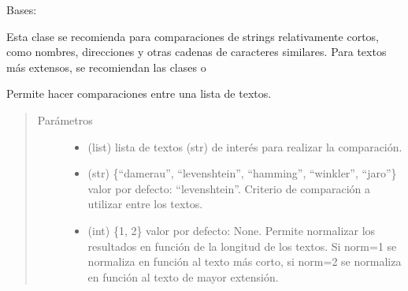 \documentclass[letterpaper,10pt,openany,spanish]{sphinxmanual}
\begin{document}
\begin{fulllineitems}
\label{\detokenize{funciones/comparacion:comparacion.DiferenciaStrings}}
Bases: 

Esta clase se recomienda para comparaciones de strings 
relativamente cortos, como nombres, direcciones y otras cadenas 
de caracteres similares. Para textos más extensos, se recomiendan las 
clases {\hyperref[\detokenize{funciones/comparacion:comparacion.Similitud}]{}} o 
{\hyperref[\detokenize{funciones/comparacion:comparacion.Distancia}]{}}

\begin{fulllineitems}
\label{\detokenize{funciones/comparacion:comparacion.DiferenciaStrings.comparacion_lista}}
Permite hacer comparaciones entre una lista de textos.
\begin{quote}\begin{description}
\item[{Parámetros}] \leavevmode\begin{itemize}
\item {} 
 \textendash{} (list) lista de textos (str) de interés para realizar 
la comparación.

\item {} 
 \textendash{} (str) \{“damerau”, “levenshtein”, “hamming”, “winkler”, 
“jaro”\} valor por defecto: “levenshtein”. Criterio de comparación 
a utilizar entre los textos.

\item {} 
 \textendash{} (int) \{1, 2\} valor por defecto: None. Permite normalizar 
los resultados en función de la longitud de los textos. 
Si norm=1 se normaliza en función al texto más corto, 
si norm=2 se normaliza en función al texto de mayor extensión.


\end{itemize}
\end{description}
\end{quote}
\end{fulllineitems}
\end{fulllineitems}
\end{document}
